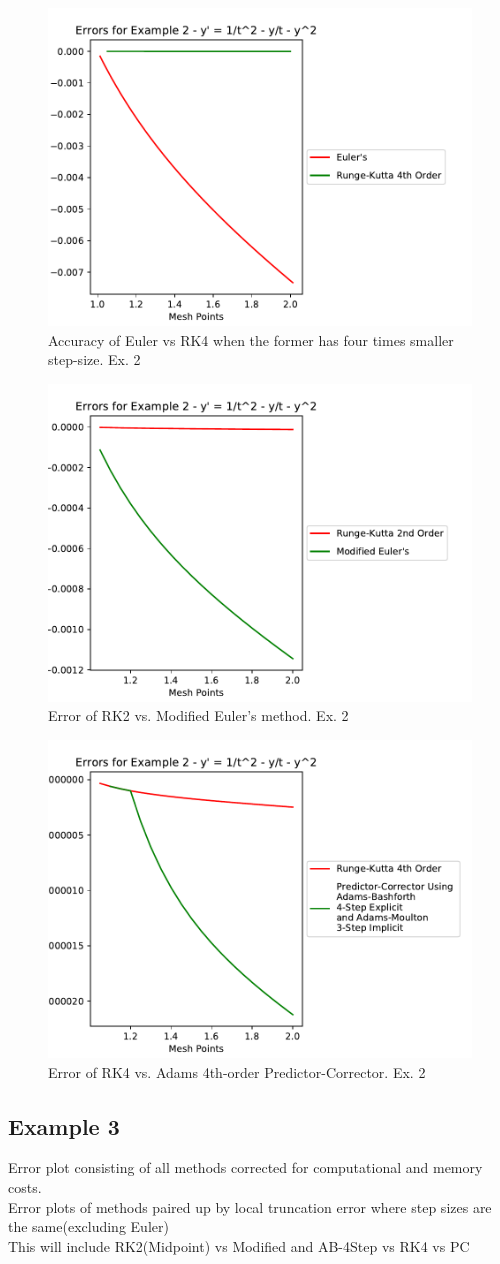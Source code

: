 \documentclass[11pt]{article}	%
\begin{document}
\begin{figure}
\centering
\includegraphics[width=.5\textwidth]{euler_rk4_2}
\caption{Accuracy of Euler vs RK4 when the former has four times smaller step-size. Ex. 2}
\label{fig:euler_rk4_2}
\end{figure}

\begin{figure}
\centering
\includegraphics[width=.5\textwidth]{rk2_meuler_2}
\caption{Error of RK2 vs. Modified Euler's method. Ex. 2}
\label{fig:rk2_meuler_2}
\end{figure}

\begin{figure}
\centering
\includegraphics[width=.5\textwidth]{rk4_predictor_2}
\caption{Error of RK4 vs. Adams 4th-order Predictor-Corrector. Ex. 2}
\label{fig:rk4_predictor_2}
\end{figure}

\subsection{Example 3}
Error plot consisting of all methods corrected for computational and memory costs.\\
Error plots of methods paired up by local truncation error where step sizes are the same(excluding Euler)   \\
\hspace{2cm} This will include RK2(Midpoint) vs Modified and AB-4Step vs RK4 vs PC
\end{document}

